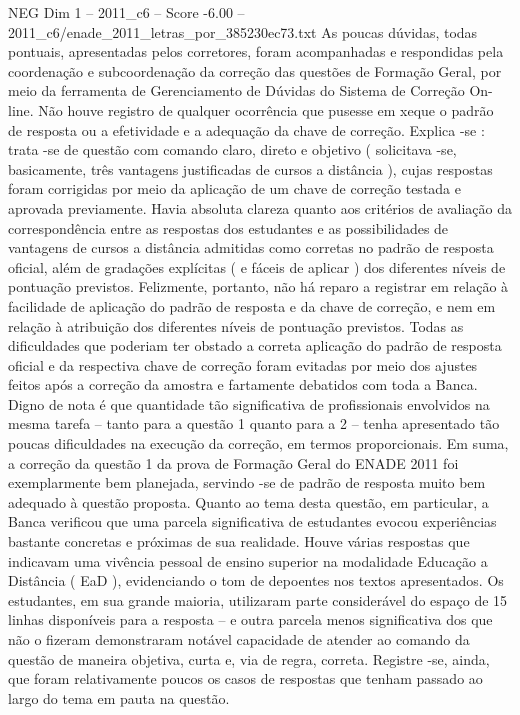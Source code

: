 \begin{textsample}{NEG Dim 1 – 2011\_c6 – Score -6.00 – 2011\_c6/enade\_2011\_letras\_por\_385230ec73.txt}
As poucas dúvidas, todas pontuais, apresentadas pelos corretores, foram acompanhadas e respondidas pela coordenação e subcoordenação da correção das questões de Formação Geral, por meio da ferramenta de Gerenciamento de Dúvidas do Sistema de Correção On-line.
Não houve registro de qualquer ocorrência que pusesse em xeque o padrão de resposta ou a efetividade e a adequação da chave de correção.
Explica -se : trata -se de questão com comando claro, direto e objetivo ( solicitava -se, basicamente, três vantagens justificadas de cursos a distância ), cujas respostas foram corrigidas por meio da aplicação de um chave de correção testada e aprovada previamente.
Havia absoluta clareza quanto aos critérios de avaliação da correspondência entre as respostas dos estudantes e as possibilidades de vantagens de cursos a distância admitidas como corretas no padrão de resposta oficial, além de gradações explícitas ( e fáceis de aplicar ) dos diferentes níveis de pontuação previstos.
Felizmente, portanto, não há reparo a registrar em relação à facilidade de aplicação do padrão de resposta e da chave de correção, e nem em relação à atribuição dos diferentes níveis de pontuação previstos.
Todas as dificuldades que poderiam ter obstado a correta aplicação do padrão de resposta oficial e da respectiva chave de correção foram evitadas por meio dos ajustes feitos após a correção da amostra e fartamente debatidos com toda a Banca.
Digno de nota é que quantidade tão significativa de profissionais envolvidos na mesma tarefa – tanto para a questão 1 quanto para a 2 – tenha apresentado tão poucas dificuldades na execução da correção, em termos proporcionais.
Em suma, a correção da questão 1 da prova de Formação Geral do ENADE 2011 foi exemplarmente bem planejada, servindo -se de padrão de resposta muito bem adequado à questão proposta.
Quanto ao tema desta questão, em particular, a Banca verificou que uma parcela significativa de estudantes evocou experiências bastante concretas e próximas de sua realidade.
Houve várias respostas que indicavam uma vivência pessoal de ensino superior na modalidade Educação a Distância ( EaD ), evidenciando o tom de depoentes nos textos apresentados.
Os estudantes, em sua grande maioria, utilizaram parte considerável do espaço de 15 linhas disponíveis para a resposta – e outra parcela menos significativa dos que não o fizeram demonstraram notável capacidade de atender ao comando da questão de maneira objetiva, curta e, via de regra, correta.
Registre -se, ainda, que foram relativamente poucos os casos de respostas que tenham passado ao largo do tema em pauta na questão.

\end{textsample}

